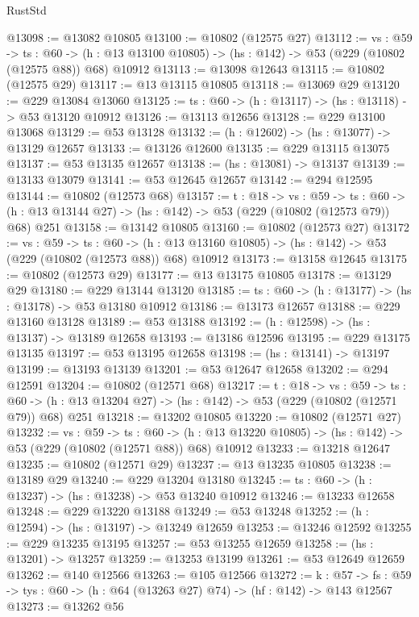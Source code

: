 \begin{lexlean}{RustStd}
\begin{coremodule}
@13098 := @13082 @10805
@13100 := @10802 (@12575 @27)
@13112 := {vs : @59} ->
  {ts : @60} ->
  (h : @13 @13100 @10805) -> (hs : @142) -> @53 (@229 (@10802 (@12575 @88)) @68) @10912
@13113 := @13098 @12643
@13115 := @10802 (@12575 @29)
@13117 := @13 @13115 @10805
@13118 := @13069 @29
@13120 := @229 @13084 @13060
@13125 := {ts : @60} -> (h : @13117) -> (hs : @13118) -> @53 @13120 @10912
@13126 := @13113 @12656
@13128 := @229 @13100 @13068
@13129 := @53 @13128
@13132 := (h : @12602) -> (hs : @13077) -> @13129 @12657
@13133 := @13126 @12600
@13135 := @229 @13115 @13075
@13137 := @53 @13135 @12657
@13138 := (hs : @13081) -> @13137
@13139 := @13133 @13079
@13141 := @53 @12645 @12657
@13142 := @294 @12595
@13144 := @10802 (@12573 @68)
@13157 := {t : @18} ->
  {vs : @59} ->
  {ts : @60} -> (h : @13 @13144 @27) -> (hs : @142) -> @53 (@229 (@10802 (@12573 @79)) @68) @251
@13158 := @13142 @10805
@13160 := @10802 (@12573 @27)
@13172 := {vs : @59} ->
  {ts : @60} ->
  (h : @13 @13160 @10805) -> (hs : @142) -> @53 (@229 (@10802 (@12573 @88)) @68) @10912
@13173 := @13158 @12645
@13175 := @10802 (@12573 @29)
@13177 := @13 @13175 @10805
@13178 := @13129 @29
@13180 := @229 @13144 @13120
@13185 := {ts : @60} -> (h : @13177) -> (hs : @13178) -> @53 @13180 @10912
@13186 := @13173 @12657
@13188 := @229 @13160 @13128
@13189 := @53 @13188
@13192 := (h : @12598) -> (hs : @13137) -> @13189 @12658
@13193 := @13186 @12596
@13195 := @229 @13175 @13135
@13197 := @53 @13195 @12658
@13198 := (hs : @13141) -> @13197
@13199 := @13193 @13139
@13201 := @53 @12647 @12658
@13202 := @294 @12591
@13204 := @10802 (@12571 @68)
@13217 := {t : @18} ->
  {vs : @59} ->
  {ts : @60} -> (h : @13 @13204 @27) -> (hs : @142) -> @53 (@229 (@10802 (@12571 @79)) @68) @251
@13218 := @13202 @10805
@13220 := @10802 (@12571 @27)
@13232 := {vs : @59} ->
  {ts : @60} ->
  (h : @13 @13220 @10805) -> (hs : @142) -> @53 (@229 (@10802 (@12571 @88)) @68) @10912
@13233 := @13218 @12647
@13235 := @10802 (@12571 @29)
@13237 := @13 @13235 @10805
@13238 := @13189 @29
@13240 := @229 @13204 @13180
@13245 := {ts : @60} -> (h : @13237) -> (hs : @13238) -> @53 @13240 @10912
@13246 := @13233 @12658
@13248 := @229 @13220 @13188
@13249 := @53 @13248
@13252 := (h : @12594) -> (hs : @13197) -> @13249 @12659
@13253 := @13246 @12592
@13255 := @229 @13235 @13195
@13257 := @53 @13255 @12659
@13258 := (hs : @13201) -> @13257
@13259 := @13253 @13199
@13261 := @53 @12649 @12659
@13262 := @140 @12566
@13263 := @105 @12566
@13272 := {k : @57} ->
  {fs : @59} -> {tys : @60} -> (h : @64 (@13263 @27) @74) -> (hf : @142) -> @143 @12567
@13273 := @13262 @56

\end{coremodule}
\end{lexlean}
